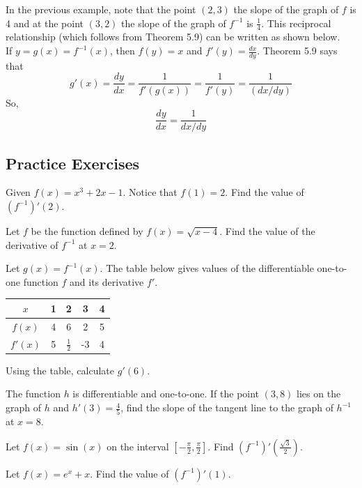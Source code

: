 \documentclass[12pt, letterpaper]{article}
\newenvironment{exercises}[1][]{
    \begin{tcolorbox}[
        colback=white,
        colframe=black,
        arc=3mm,
        boxrule=1pt,
        breakable,
        enhanced,
        parbox=false
    ]

    \subsection*{Practice Exercises}

    \if\relax\detokenize{#1}\relax\else
        \noindent #1\par\medskip
    \fi

    \begin{exlist}[resume=practice_series]
}{
    \end{exlist}

    \vspace{1in}

    \end{tcolorbox}
}
\begin{document}
In the previous example, note that the point $(2,3)$ the slope of the graph of $f$ is 4 and at the point $(3,2)$ the slope of the graph of $f^{-1}$ is $\frac{1}{4}$. This reciprocal relationship (which follows from Theorem 5.9) can be written as shown below. \\
If $y=g(x)=f^{-1}(x)$, then $f(y)=x$ and $f'(y) = \frac{dx}{dy}$. Theorem 5.9 says that 
$$g'(x) = \frac{dy}{dx} = \frac{1}{f'(g(x))} = \frac{1}{f'(y)} = \frac{1}{(dx/dy)}$$
So,
$$\frac{dy}{dx} = \frac{1}{dx/dy}$$

\begin{exercises}
    \item Given $f(x) = x^3 + 2x - 1$. Notice that $f(1)=2$. Find the value of $(f^{-1})'(2)$.
    \item Let $f$ be the function defined by $f(x) = \sqrt{x-4}$. Find the value of the derivative of $f^{-1}$ at $x=2$.
    \item Let $g(x) = f^{-1}(x)$. The table below gives values of the differentiable one-to-one function $f$ and its derivative $f'$.
    \begin{center}
    \begin{tabular}{|c|c|c|c|c|}
        \hline
        $x$ & 1 & 2 & 3 & 4 \\
        \hline
        $f(x)$ & 4 & 6 & 2 & 5 \\
        \hline
        $f'(x)$ & 5 & $\frac{1}{2}$ & -3 & 4 \\
        \hline
    \end{tabular}
    \end{center}
    Using the table, calculate $g'(6)$.
    \item The function $h$ is differentiable and one-to-one. If the point $(3, 8)$ lies on the graph of $h$ and $h'(3) = \frac{4}{5}$, find the slope of the tangent line to the graph of $h^{-1}$ at $x=8$.
    \item Let $f(x) = \sin(x)$ on the interval $[-\frac{\pi}{2}, \frac{\pi}{2}]$. Find $(f^{-1})'(\frac{\sqrt{3}}{2})$.
    \item Let $f(x) = e^x + x$. Find the value of $(f^{-1})'(1)$.
\end{exercises}

\newpage
\end{document}
